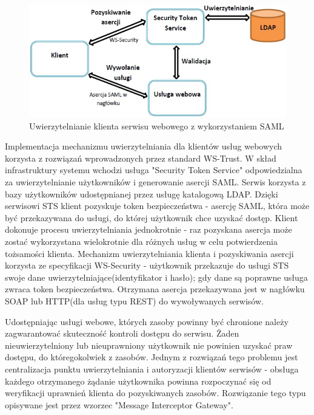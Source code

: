 		\begin{figure}[h]
			\centering
			\includegraphics{img/samlWS.jpg}
			\caption{Uwierzytelnianie klienta serwisu webowego z wykorzystaniem SAML}
			\label{Uwierzytelnianie klienta serwisu webowego z wykorzystaniem SAML}
		\end{figure}

		Implementacja mechanizmu uwierzytelniania dla klientów usług webowych korzysta z rozwiązań wprowadzonych przez standard WS-Trust. W skład infrastruktury systemu wchodzi usługa "Security Token Service" odpowiedzialna za uwierzytelnianie użytkowników i generowanie asercji SAML. Serwis korzysta z bazy użytkowników udostępnianej przez usługę katalogową LDAP. Dzięki serwisowi STS klient pozyskuje token bezpieczeństwa - asercję SAML, która może być przekazywana do usługi, do której użytkownik chce uzyskać dostęp. Klient dokonuje procesu uwierzytelniania jednokrotnie - raz pozyskana asercja może zostać wykorzystana wielokrotnie dla różnych usług w celu potwierdzenia tożsamości klienta. Mechanizm uwierzytelniania klienta i pozyskiwania asercji korzysta ze specyfikacji WS-Security - użytkownik przekazuje do usługi STS swoje dane uwierzytelniające(identyfikator i hasło); gdy dane są poprawne usługa zwraca token bezpieczeństwa. Otrzymana asercja przekazywana jest w nagłówku SOAP lub HTTP(dla usług typu REST) do wywoływanych serwisów.

	Udostępniając usługi webowe, których zasoby powinny być chronione należy zagwarantować skuteczność kontroli dostępu do serwisu. Żaden nieuwierzytelniony lub nieuprawniony użytkownik nie powinien uzyskać praw dostępu, do któregokolwiek z zasobów. Jednym z rozwiązań tego problemu jest centralizacja punktu uwierzytelniania i autoryzacji klientów serwisów - obsługa każdego otrzymanego żądanie użytkownika powinna rozpoczynać się od weryfikacji uprawnień klienta do pozyskiwanych zasobów. Rozwiązanie tego typu opisywane jest przez wzorzec "Message Interceptor Gateway". 

